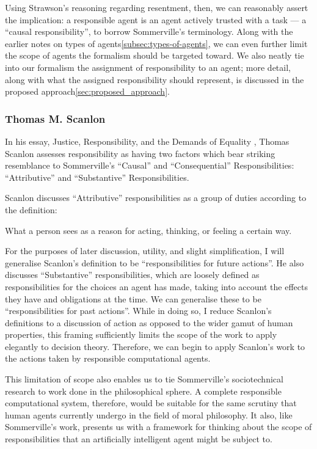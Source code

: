 Using Strawson's reasoning regarding resentment, then, we can reasonably assert the implication: a responsible agent is an agent actively trusted with a task ---  a ``causal responsibility'', to borrow Sommerville's terminology. Along with the earlier notes on types of agents\cref{subsec:types-of-agents}, we can even further limit the scope of agents the formalism should be targeted toward. We also neatly tie into our formalism the assignment of responsibility to an agent; more detail, along with what the assigned responsibility should represent, is discussed in the proposed approach\cref{sec:proposed_approach}.\par

\subsubsection{Thomas M. Scanlon}
In his essay, Justice, Responsibility, and the Demands of Equality \parencite{scanlon2006justice}, Thomas Scanlon assesses responsibility as having two factors which bear striking resemblance to Sommerville's ``Causal'' and ``Consequential'' Responsibilities: ``Attributive'' and ``Substantive'' Responsibilities.\par

Scanlon discusses ``Attributive'' responsibilities as a group of duties according to the definition:
\begin{displayquote}
    What a person sees as a reason for acting, thinking, or feeling a certain way.
\end{displayquote}\par

For the purposes of later discussion, utility, and slight simplification, I will generalise Scanlon's definition to be ``responsibilities for future actions''. He also discusses ``Substantive'' responsibilities, which are loosely defined as responsibilities for the choices an agent has made, taking into account the effects they have and obligations at the time. We can generalise these to be ``responsibilities for past actions''. While in doing so, I reduce Scanlon's definitions to a discussion of action as opposed to the wider gamut of human properties, this framing sufficiently limits the scope of the work to apply elegantly to decision theory. Therefore, we can begin to apply Scanlon's work to the actions taken by responsible computational agents.\par

This limitation of scope also enables us to tie Sommerville's sociotechnical research to work done in the philosophical sphere. A complete responsible computational system, therefore, would be suitable for the same scrutiny that human agents currently undergo in the field of moral philosophy. It also, like Sommerville's work, presents us with a framework for thinking about the scope of responsibilities that an artificially intelligent agent might be subject to.\par


